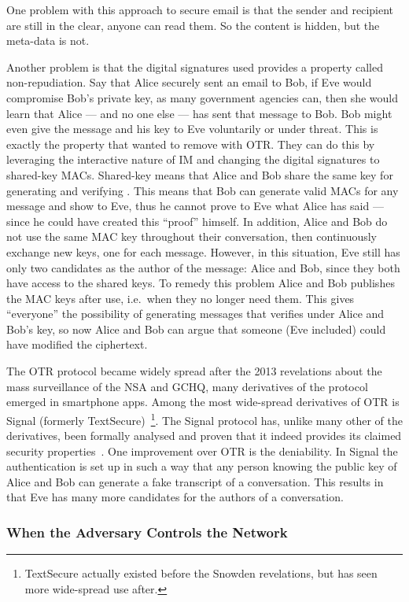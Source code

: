 One problem with this approach to secure email is that the sender and recipient
are still in the clear, anyone can read them.
So the content is hidden, but the meta-data is not.

Another problem is that the digital signatures used provides a property called 
non-repudiation.
Say that Alice securely sent an email to Bob, if Eve would compromise Bob's 
private key, as many government agencies can, then she would learn that Alice 
--- and no one else --- has sent that message to Bob.
Bob might even give the message and his key to Eve voluntarily or under threat.
This is exactly the property that \citeauthor{otr2004} wanted to remove with 
\ac{OTR}.
They can do this by leveraging the interactive nature of \ac{IM} and changing 
the digital signatures to shared-key \acp{MAC}.
Shared-key means that Alice and Bob share the same key for generating and 
verifying .
This means that Bob can generate valid \acp{MAC} for any message and show to 
Eve, thus he cannot prove to Eve what Alice has said --- since he could have 
created this \enquote{proof} himself.
In addition, Alice and Bob do not use the same \ac{MAC} key throughout their 
conversation, then continuously exchange new keys, one for each message.
However, in this situation, Eve still has only two candidates as the author of 
the message: Alice and Bob, since they both have access to the shared keys.
To remedy this problem Alice and Bob publishes the \ac{MAC} keys after use, 
i.e.\ when they no longer need them.
This gives \enquote{everyone} the possibility of generating messages that 
verifies under Alice and Bob's key, so now Alice and Bob can argue that someone 
(Eve included) could have modified the ciphertext.

The \ac{OTR} protocol became widely spread after the 2013 revelations about the
mass surveillance of the \ac{NSA} and \ac{GCHQ}, many derivatives of the 
protocol emerged in smartphone apps.
Among the most wide-spread derivatives of \ac{OTR} is Signal (formerly 
TextSecure)~\cite{SignalApp}\footnote{%
  TextSecure actually existed before the Snowden revelations, but has seen more
  wide-spread use after.
}.
The Signal protocol has, unlike many other of the derivatives, been formally 
analysed and proven that it indeed provides its claimed security 
properties~\cite{TextSecureAnalysis}.
One improvement over \ac{OTR} is the deniability.
In Signal the authentication is set up in such a way that any person knowing 
the public key of Alice and Bob can generate a fake transcript of 
a conversation.
This results in that Eve has many more candidates for the authors of 
a conversation.

\subsubsection{When the Adversary Controls the Network}


